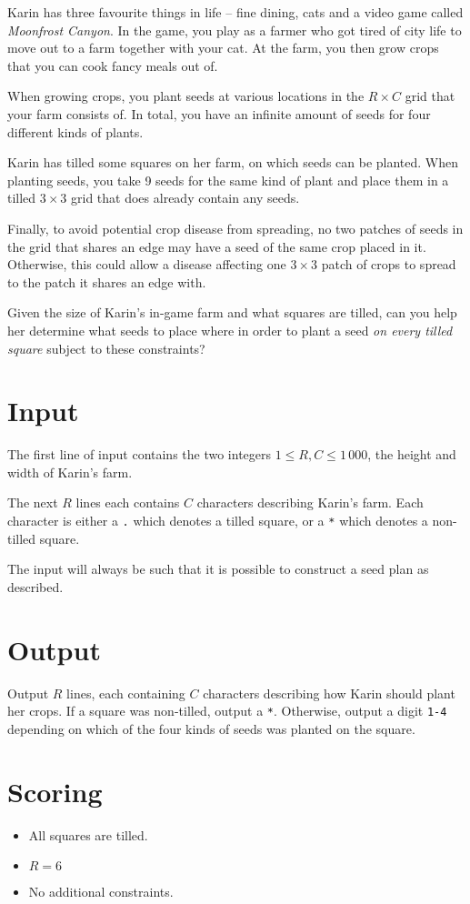 Karin has three favourite things in life -- fine dining, cats and a video game called \emph{Moonfrost Canyon}.
In the game, you play as a farmer who got tired of city life to move out to a farm together with your cat.
At the farm, you then grow crops that you can cook fancy meals out of.

When growing crops, you plant seeds at various locations in the $R \times C$ grid that your farm consists of.
In total, you have an infinite amount of seeds for four different kinds of plants. 

Karin has tilled some squares on her farm, on which seeds can be planted.
When planting seeds, you take 9 seeds for the same kind of plant and place them in a tilled $3 \times 3$ grid that does already contain any seeds.

Finally, to avoid potential crop disease from spreading, no two patches of seeds in the grid that shares an edge may have a seed of the same crop placed in it.
Otherwise, this could allow a disease affecting one $3 \times 3$ patch of crops to spread to the patch it shares an edge with.

Given the size of Karin's in-game farm and what squares are tilled, can you help her determine what seeds to place where in order to plant a seed \emph{on every tilled square} subject to these constraints?

\section*{Input}
The first line of input contains the two integers $1 \le R, C \le 1\,000$, the height and width of Karin's farm.

The next $R$ lines each contains $C$ characters describing Karin's farm.
Each character is either a \texttt{.} which denotes a tilled square, or a \texttt{*} which denotes a non-tilled square.

The input will always be such that it is possible to construct a seed plan as described.

\section*{Output}
Output $R$ lines, each containing $C$ characters describing how Karin should plant her crops.
If a square was non-tilled, output a \texttt{*}.
Otherwise, output a digit \texttt{1-4} depending on which of the four kinds of seeds was planted on the square.

\section*{Scoring}
\begin{itemize}
  \item All squares are tilled.
  \item $R = 6$
  \item No additional constraints.
\end{itemize}
